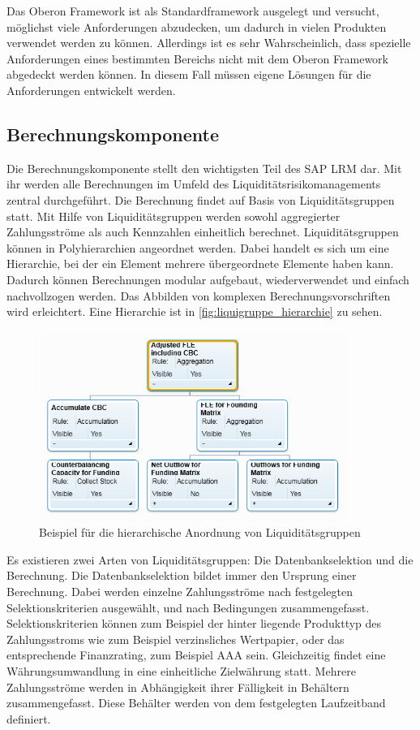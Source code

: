 \begin{onehalfspacing}
Das Oberon Framework ist als Standardframework ausgelegt und versucht, möglichst viele Anforderungen abzudecken, um dadurch in vielen Produkten verwendet werden zu können. Allerdings ist es sehr Wahrscheinlich, dass spezielle Anforderungen eines bestimmten Bereichs nicht mit dem Oberon Framework abgedeckt werden können. In diesem Fall müssen eigene Lösungen für die Anforderungen entwickelt werden.

\subsection{Berechnungskomponente}
\label{sec:berechnungskomponente}
Die Berechnungskomponente stellt den wichtigsten Teil des SAP LRM dar. Mit ihr werden alle Berechnungen im Umfeld des Liquiditätsrisikomanagements zentral durchgeführt. Die Berechnung findet auf Basis von Liquiditätsgruppen statt. Mit Hilfe von Liquiditätsgruppen werden sowohl aggregierter Zahlungsströme als auch Kennzahlen einheitlich berechnet. Liquiditätsgruppen können in Polyhierarchien angeordnet werden. Dabei handelt es sich um eine Hierarchie, bei der ein Element mehrere übergeordnete Elemente haben kann. Dadurch können Berechnungen modular aufgebaut, wiederverwendet und einfach nachvollzogen werden. Das Abbilden von komplexen Berechnungsvorschriften wird erleichtert. Eine Hierarchie ist in \vref{fig:liquigruppe_hierarchie} zu sehen.

\begin{figure}[h]
\centering
\setlength{\unitlength}{1mm}
\includegraphics[width=10cm]{images/liquigruppe_hierarchie.PNG}
\caption{
Beispiel für die hierarchische Anordnung von Liquiditätsgruppen
\label{fig:liquigruppe_hierarchie}}
\end{figure} 

Es existieren zwei Arten von Liquiditätsgruppen: Die Datenbankselektion und die Berechnung. Die Datenbankselektion bildet immer den Ursprung einer Berechnung. Dabei werden einzelne Zahlungsströme nach festgelegten Selektionskriterien ausgewählt, und nach Bedingungen zusammengefasst. Selektionskriterien können zum Beispiel der hinter liegende Produkttyp des Zahlungsstroms wie zum Beispiel verzinsliches Wertpapier, oder das entsprechende Finanzrating, zum Beispiel AAA sein. Gleichzeitig findet eine Währungsumwandlung in eine einheitliche Zielwährung statt. Mehrere Zahlungsströme werden in Abhängigkeit ihrer Fälligkeit in Behältern zusammengefasst. Diese Behälter werden von dem festgelegten Laufzeitband definiert.


\end{onehalfspacing}
